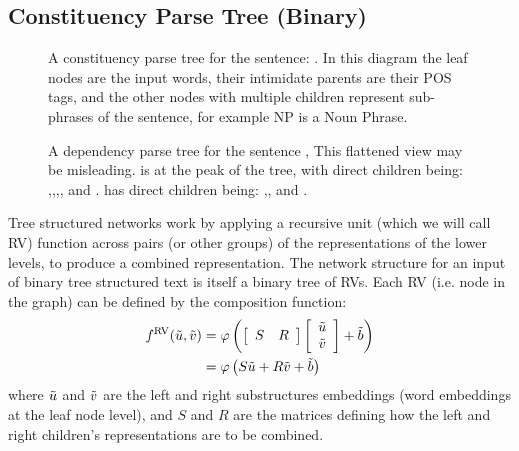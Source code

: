 \documentclass[12pt,parskip]{komatufte}
\begin{document}
\subsection{Constituency Parse Tree (Binary)}

\begin{figure}
	\caption{A constituency parse tree for the sentence: . In this diagram the leaf nodes are the input words, their intimidate parents are their POS tags, and the other nodes with multiple children represent sub-phrases of the sentence, for example NP is a Noun Phrase.}
	\label{fig:consparse}
\end{figure}


\begin{figure}
	\caption{A dependency parse tree for the sentence ,
		This flattened view may be misleading.
		 is at the peak of the tree, with direct children	being:
		,,,,
		and .
		 has direct children being: ,, and .
	}
	\label{fig:depparse}
\end{figure}



Tree structured networks work by applying a recursive unit (which we will call RV) function across pairs (or other groups) of the representations of the lower levels, to produce a combined representation.
The network structure for an input of binary tree structured text is itself a binary tree of RVs.
Each RV (i.e. node in the graph) can be defined by the composition function:
\begin{align}
	\d f_{RV}(\v u, \v v) &= \varphi\left(\left[\begin{array}{cc}
	S & R\end{array}\right]\left[\begin{array}{c}
	\v u\\
	\v v
	\end{array}\right] + \v b \right) \\ \label{equ:rnn1}
			     &= \varphi\left( S\v u +R\v v + \v b \right)
\end{align}
where $\tilde{u}$ and $\tilde{v}$ are the left and right substructures embeddings (word embeddings at the leaf node level), and $S$ and $R$ are the matrices defining how the left and right children's representations are to be combined.
\end{document}
